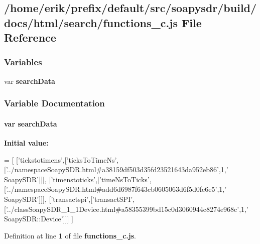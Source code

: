 \subsection{/home/erik/prefix/default/src/soapysdr/build/docs/html/search/functions\+\_\+c.js File Reference}
\label{functions__c_8js}
\subsubsection*{Variables}
\begin{DoxyCompactItemize}
\item 
var {\bf search\+Data}
\end{DoxyCompactItemize}


\subsubsection{Variable Documentation}
\paragraph[{search\+Data}]{\setlength{\rightskip}{0pt plus 5cm}var search\+Data}\label{functions__c_8js_ad01a7523f103d6242ef9b0451861231e}
{\bfseries Initial value\+:}
\begin{DoxyCode}
=
[
  [\textcolor{stringliteral}{'tickstotimens'},[\textcolor{stringliteral}{'ticksToTimeNs'},[\textcolor{stringliteral}{'../namespaceSoapySDR.html#a38159df503d35fd23521643da952eb86'},1,\textcolor{stringliteral}{'
      SoapySDR'}]]],
  [\textcolor{stringliteral}{'timenstoticks'},[\textcolor{stringliteral}{'timeNsToTicks'},[\textcolor{stringliteral}{'../namespaceSoapySDR.html#add6d6987f643cb0605063d6f5d0fe6e5'},1,\textcolor{stringliteral}{'
      SoapySDR'}]]],
  [\textcolor{stringliteral}{'transactspi'},[\textcolor{stringliteral}{'transactSPI'},[\textcolor{stringliteral}{'../classSoapySDR\_1\_1Device.html#a58355399bd15c0d3060944c8274e968c'},1,\textcolor{stringliteral}{'
      SoapySDR::Device'}]]]
]
\end{DoxyCode}


Definition at line {\bf 1} of file {\bf functions\+\_\+c.\+js}.

